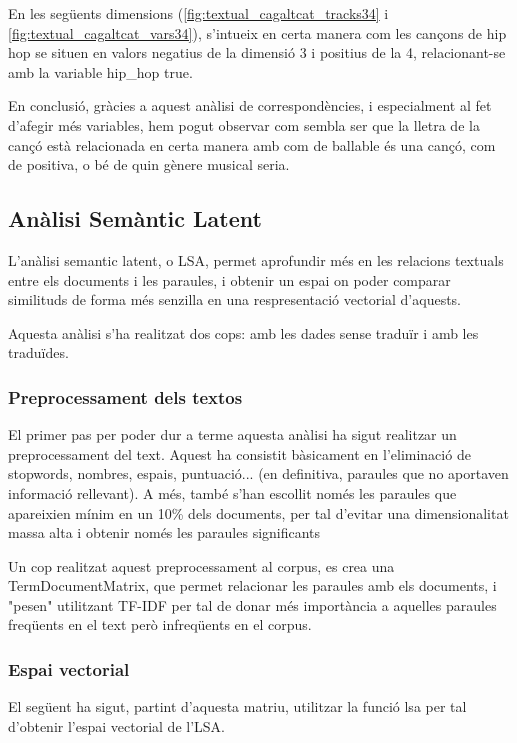 En les següents dimensions (\ref{fig:textual_cagaltcat_tracks34} i \ref{fig:textual_cagaltcat_vars34}), s'intueix en certa manera com les cançons de hip hop se situen en valors negatius de la dimensió 3 i positius de la 4, relacionant-se amb la variable hip\_hop true.


En conclusió, gràcies a aquest anàlisi de correspondències, i especialment al fet d'afegir més variables, hem pogut observar com sembla ser que la lletra de la cançó està relacionada en certa manera amb com de ballable és una cançó, com de positiva, o bé de quin gènere musical seria. 

\subsection{Anàlisi Semàntic Latent}\label{LSA}

L'anàlisi semantic latent, o LSA, permet aprofundir més en les relacions textuals entre els documents i les paraules, i obtenir un espai on poder comparar similituds de forma més senzilla en una respresentació vectorial d'aquests.

Aquesta anàlisi s'ha realitzat dos cops: amb les dades sense traduïr i amb les traduïdes.

\subsubsection{Preprocessament dels textos}
El primer pas per poder dur a terme aquesta anàlisi ha sigut realitzar un preprocessament del text. Aquest ha consistit bàsicament en l'eliminació de stopwords, nombres, espais, puntuació... (en definitiva, paraules que no aportaven informació rellevant). A més, també s'han escollit només les paraules que apareixien mínim en un 10\% dels documents, per tal d'evitar una dimensionalitat massa alta i obtenir només les paraules significants

Un cop realitzat aquest preprocessament al corpus, es crea una TermDocumentMatrix, que permet relacionar les paraules amb els documents, i "pesen" utilitzant TF-IDF per tal de donar més importància a aquelles paraules freqüents en el text però infreqüents en el corpus.

\subsubsection{Espai vectorial}

El següent ha sigut, partint d'aquesta matriu, utilitzar la funció lsa per tal d'obtenir l'espai vectorial de l'LSA.

